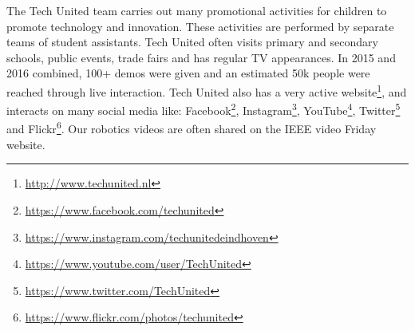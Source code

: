 The Tech United team carries out many promotional activities for children to promote technology and innovation. These activities are performed by separate teams of student assistants. Tech United often visits primary and secondary schools, public events, trade fairs and has regular TV appearances. In 2015 and 2016 combined, 100+ demos were given and an estimated 50k people were reached through live interaction.
Tech United also has a very active website\footnote{\url{http://www.techunited.nl}}, and interacts on many social media like: Facebook\footnote{\url{https://www.facebook.com/techunited}}, Instagram\footnote{\url{https://www.instagram.com/techunitedeindhoven}}, YouTube\footnote{\url{https://www.youtube.com/user/TechUnited}}, Twitter\footnote{\url{https://www.twitter.com/TechUnited}} and Flickr\footnote{\url{https://www.flickr.com/photos/techunited}}. Our robotics videos are often shared on the IEEE video Friday website. 